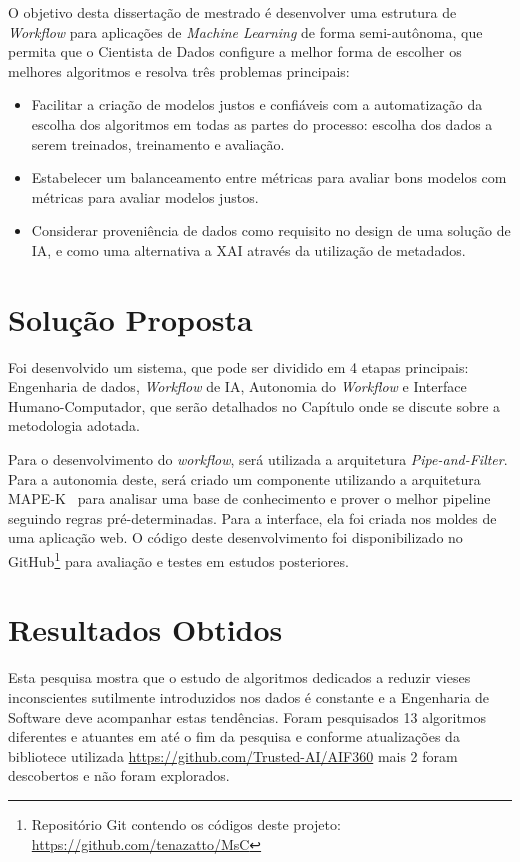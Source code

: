 \documentclass[portugues]{ic-tese}
\begin{document}
O objetivo desta dissertação de mestrado é desenvolver uma estrutura de \textit{Workflow} para aplicações de \textit{Machine Learning} de forma semi-autônoma, que permita que o Cientista de Dados configure a melhor forma de escolher os melhores algoritmos e resolva três problemas principais:

\begin{itemize}
\item Facilitar a criação de modelos justos e confiáveis com a automatização da escolha dos algoritmos em todas as partes do processo: escolha dos dados a serem treinados, treinamento e avaliação.
\item Estabelecer um balanceamento entre métricas para avaliar bons modelos com métricas para avaliar modelos justos.
\item Considerar proveniência de dados como requisito no design de uma solução de IA, e como uma alternativa a XAI através da utilização de metadados.
\end{itemize}

\section{Solução Proposta}

Foi desenvolvido um sistema, que pode ser dividido em 4 etapas principais: Engenharia de dados, \textit{Workflow} de IA, Autonomia do \textit{Workflow} e Interface Humano-Computador, que serão detalhados no Capítulo onde se discute sobre a metodologia adotada.

Para o desenvolvimento do \textit{workflow}, será utilizada a arquitetura \textit{Pipe-and-Filter}. Para a autonomia deste, será criado um componente utilizando a arquitetura MAPE-K~\citep{IBM_2005} para analisar uma base de conhecimento e prover o melhor pipeline seguindo regras pré-determinadas. Para a interface, ela foi criada nos moldes de uma aplicação web. O código deste desenvolvimento foi disponibilizado no GitHub\footnote{Repositório Git contendo os códigos deste projeto: \url{https://github.com/tenazatto/MsC}} para avaliação e testes em estudos posteriores.

\section{Resultados Obtidos}

Esta pesquisa mostra que o estudo de algoritmos dedicados a reduzir vieses inconscientes sutilmente introduzidos nos dados é constante e a Engenharia de Software deve acompanhar estas tendências. Foram pesquisados 13 algoritmos diferentes e atuantes em até o fim da pesquisa e conforme atualizações da bibliotece utilizada \url{https://github.com/Trusted-AI/AIF360} mais 2 foram descobertos e não foram explorados.
\end{document}
